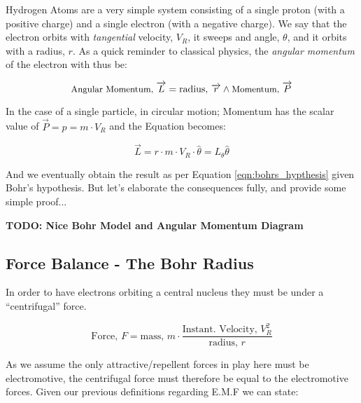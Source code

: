 \documentclass[../../Quantum-Technologies-Notes]{subfiles}
\begin{document}
			Hydrogen Atoms are a very simple system consisting of a single proton (with a positive charge) and a single electron (with a negative charge). We say that the electron orbits with \textit{tangential} velocity, $V_R$, it sweeps and angle, $\theta$, and it orbits with a radius, $r$. As a quick reminder to classical physics, the \textit{angular momentum} of the electron with thus be:
		
			\begin{equation*}
					\text{\small Angular Momentum, }\overrightarrow{L}  =  \text{radius, }\overrightarrow{r}  \wedge  \text{\small Momentum, }\overrightarrow{P}
				\end{equation*}
			
			In the case of a single particle, in circular motion; Momentum has the scalar value of $\overrightarrow{P} = p = m \cdot V_R$ and the Equation becomes:
			
			\begin{equation*}
					\overrightarrow{L}  =  r \cdot m \cdot V_R \cdot \hat{\theta} = L_\theta \hat{\theta}
				\end{equation*}
			
			And we eventually obtain the result as per Equation \ref{eqn:bohrs_hypthesis} given Bohr's hypothesis. But let's elaborate the consequences fully, and provide some simple proof... \linebreak
			
			
			\textbf{\LARGE\color{heading}TODO: Nice Bohr Model and Angular Momentum Diagram} %
			
			
		\subsection{Force Balance - The Bohr Radius}
			In order to have electrons orbiting a central nucleus they must be under a ``centrifugal'' force.
			
			\begin{equation*}
					\text{Force, }F  =  \text{mass, }m  \cdot  \frac{\text{Instant. Velocity, }V_R^2}{\text{radius, }r}
				\end{equation*}
			
			\vspace{5mm}
			
			As we assume the only attractive/repellent forces in play here must be electromotive, the centrifugal force must therefore be equal to the electromotive forces. Given our previous definitions regarding E.M.F we can state:
			
\end{document}
